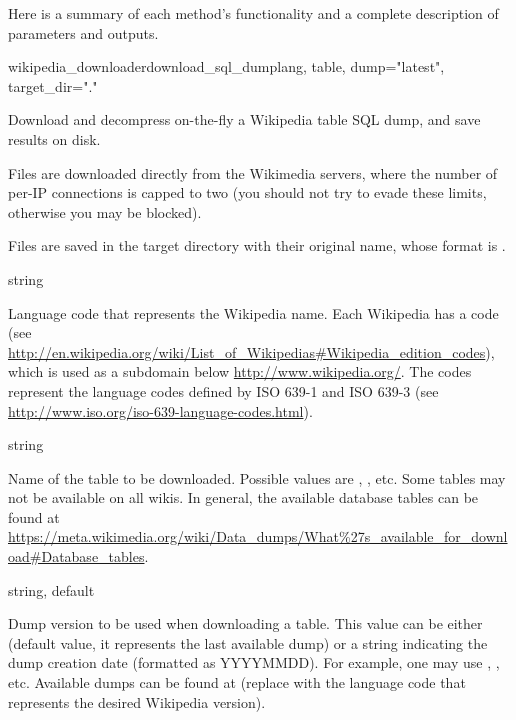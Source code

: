             Here is a summary of each method's functionality and a complete description of parameters and outputs.
            \begin{functiondoc}{wikipedia\_downloader}{download\_sql\_dump}{lang, table, dump="latest", target\_dir="."}
                \begin{functiondescription}
                    Download and decompress on-the-fly a Wikipedia table SQL dump, and save results on disk.
                    
                    Files are downloaded directly from the Wikimedia servers, where the number of per-IP connections is capped to two (you should not try to evade these limits, otherwise you may be blocked).

                    Files are saved in the target directory with their original name, whose format is .
                \end{functiondescription}

                \begin{functionparameters}
                    \item[lang] string
                    
                    Language code that represents the Wikipedia name. Each Wikipedia has a code (see \url{http://en.wikipedia.org/wiki/List_of_Wikipedias\#Wikipedia_edition_codes}), which is used as a subdomain below \url{http://www.wikipedia.org/}. The codes represent the language codes defined by ISO 639-1 and ISO 639-3 (see \url{http://www.iso.org/iso-639-language-codes.html}).
                    \item[table] string
                    
                    Name of the table to be downloaded. Possible values are , ,  etc. Some tables may not be available on all wikis. In general, the available database tables can be found at \url{https://meta.wikimedia.org/wiki/Data_dumps/What\%27s_available_for_download\#Database_tables}.
                    \item[dump] string, default 
                    
                    Dump version to be used when downloading a table. This value can be either  (default value, it represents the last available dump) or a string indicating the dump creation date (formatted as YYYYMMDD). For example, one may use , , etc. Available dumps can be found at  (replace \monospace{[lang]} with the language code that represents the desired Wikipedia version).
                    

\end{functionparameters}
\end{functiondoc}
